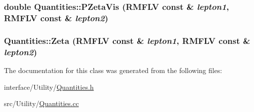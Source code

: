 \label{classQuantities_a70c44bbcb5e39b7cac66c77e0a13752a}
\hypertarget{classQuantities_a91b49158b83fd623138f6b5968d0d294}{
\subsubsection[{PZetaVis}]{\setlength{\rightskip}{0pt plus 5cm}double Quantities::PZetaVis (RMFLV const \& {\em lepton1}, \/  RMFLV const \& {\em lepton2})}}
\label{classQuantities_a91b49158b83fd623138f6b5968d0d294}
\hypertarget{classQuantities_a214721799dc069fac3d24b19e5b4ffc8}{
\subsubsection[{Zeta}]{ Quantities::Zeta (RMFLV const \& {\em lepton1}, \/  RMFLV const \& {\em lepton2})}}
\label{classQuantities_a214721799dc069fac3d24b19e5b4ffc8}


The documentation for this class was generated from the following files:\begin{DoxyCompactItemize}
\item 
interface/Utility/\hyperlink{Quantities_8h}{Quantities.h}\item 
src/Utility/\hyperlink{Quantities_8cc}{Quantities.cc}\end{DoxyCompactItemize}
